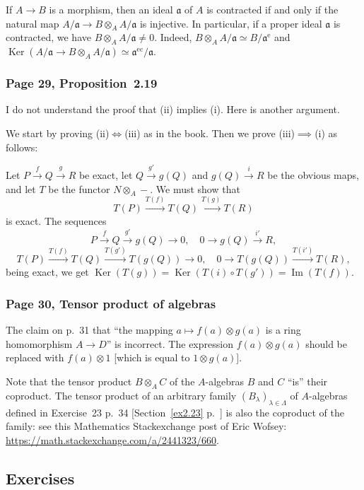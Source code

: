 \documentclass[12pt,letterpaper]{article}%
\newcommand{\oo}{\operatorname}\newcommand{\ooo}{\operatorname*}
\newcommand{\mf}{\mathfrak}
\newcommand{\aaa}{\mf a}
\newcommand{\Ker}{\operatorname{Ker}}\newcommand{\Coker}{\operatorname{Coker}}
\newcommand{\xr}{\xrightarrow}
\begin{document}
If $A\to B$ is a morphism, then an ideal $\aaa$ of $A$ is contracted if and only if the natural map $A/\aaa\to B\otimes_A A/\aaa$ is injective. In particular, if a proper ideal $\aaa$ is contracted, we have $B\otimes_A A/\aaa\ne0$. Indeed, $B\otimes_A A/\aaa\simeq B/\aaa^{\oo e}$ and $\oo{Ker}(A/\aaa\to B\otimes_A A/\aaa)\simeq\aaa^{\oo{ec}}/\aaa$. %

\subsubsection{Page 29, Proposition~2.19}%

I do not understand the proof that (ii) implies (i). Here is another argument.

We start by proving (ii)$\iff$(iii) as in the book. Then we prove (iii)$\implies$(i) as follows:

Let $P\xr fQ\xr gR$ be exact, let $Q\xr{g'}g(Q)$ and $g(Q)\xr iR$ be the obvious maps, and let $T$ be the functor $N\otimes_A-$. We must show that 
$$
T(P)\xr{T(f)}T(Q)\xr{T(g)}T(R)
$$ 
is exact. The sequences 
$$
P\xr fQ\xr{g'}g(Q)\to0,\quad0\to g(Q)\xr{i'}R,
$$ 
$$
T(P)\xr{T(f)}T(Q)\xr{T(g')}T(g(Q))\to0,\quad0\to T(g(Q))\xr{T(i')}T(R),
$$ 
being exact, we get $
\Ker(T(g))=\Ker(T(i)\circ T(g'))=\oo{Im}(T(f))$.

\subsubsection{Page 30, Tensor product of algebras}\label{tpa}%

The claim on p.~31 that ``the mapping $a\mapsto f(a)\otimes g(a)$ is a ring homomorphism $A\to D$'' is incorrect. The expression $f(a)\otimes g(a)$ should be replaced with $f(a)\otimes1$ [which is equal to $1\otimes g(a)$].

Note that the tensor product $B\otimes_AC$ of the $A$-algebras $B$ and $C$ ``is'' their coproduct. The tensor product of an arbitrary family $(B_\lambda)_{\lambda\in\Lambda}$ of $A$-algebras defined in Exercise~23 p.~34 [Section~\ref{ex2.23} p.~\pageref{ex2.23}] is also the coproduct of the family: see this Mathematics Stackexchange post of Eric Wofsey: \href{https://math.stackexchange.com/a/2441323/660}{https://math.stackexchange.com/a/2441323/660}.

\subsection{Exercises}%
\end{document}
